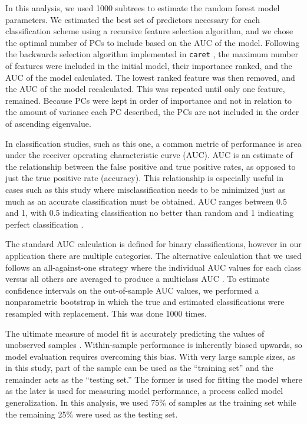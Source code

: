 \documentclass[12pt,letterpaper]{article}
\begin{document}
In this analysis, we used 1000 subtrees to estimate the random forest model parameters. We estimated the best set of predictors necessary for each classification scheme using a recursive feature selection algorithm, and we chose the optimal number of PCs to include based on the AUC of the model. Following the backwards selection algorithm implemented in \texttt{caret} \citep{KuhnMAN2013}, the maximum number of features were included in the initial model, their importance ranked, and the AUC of the model calculated. The lowest ranked feature was then removed, and the AUC of the model recalculated. This was repeated until only one feature, remained. Because PCs were kept in order of importance and not in relation to the amount of variance each PC described, the PCs are not included in the order of ascending eigenvalue.

In classification studies, such as this one, a common metric of performance is area under the receiver operating characteristic curve (AUC). AUC is an estimate of the relationship between the false positive and true positive rates, as opposed to just the true positive rate (accuracy). This relationship is especially useful in cases such as this study where misclassification needs to be minimized just as much as an accurate classification must be obtained. AUC ranges between 0.5 and 1, with 0.5 indicating classification no better than random and 1 indicating perfect classification \citep{Hastie2009}.

The standard AUC calculation is defined for binary classifications, however in our application there are multiple categories. The alternative calculation that we used follows an all-against-one strategy where the individual AUC values for each class versus all others are averaged to produce a multiclass AUC \citep{Hand2001}. To estimate confidence intervals on the out-of-sample AUC values, we performed a nonparametric bootstrap in which the true and estimated classifications were resampled with replacement. This was done 1000 times.

The ultimate measure of model fit is accurately predicting the values of unobserved samples \citep{Hastie2009,Kuhn2013}. Within-sample performance is inherently biased upwards, so model evaluation requires overcoming this bias. With very large sample sizes, as in this study, part of the sample can be used as the ``training set'' and the remainder acts as the ``testing set.'' The former is used for fitting the model where as the later is used for measuring model performance, a process called model generalization. In this analysis, we used 75\% of samples as the training set while the remaining 25\% were used as the testing set.
\end{document}
